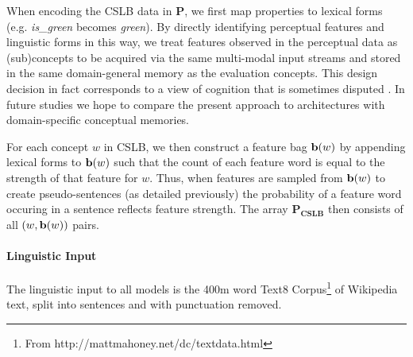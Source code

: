 When encoding the CSLB data in \(\mathbf{P}\), we first map properties to lexical forms (e.g. \emph{is\_green} becomes \emph{green}). By directly identifying perceptual features and linguistic forms in this way, we treat features observed in the perceptual data as (sub)concepts to be acquired via the same multi-modal input streams and stored in the same domain-general memory as the evaluation concepts. This design decision in fact corresponds to a view of cognition that is sometimes disputed \cite{fodor1983modularity}. In future studies we hope to compare the present approach to architectures with domain-specific conceptual memories. 

For each concept \(w\) in CSLB, we then construct a feature bag \({\bf b}(w)\) by appending lexical forms to \({\bf b}(w)\) such that the count of each feature word is equal to the strength of that feature for \(w\). Thus, when features are sampled from \({\bf b}(w)\) to create pseudo-sentences (as detailed previously) the probability of a feature word occuring in a sentence reflects feature strength. The array \(\mathbf{P_{CSLB}}\) then consists of all \( (w,  {\bf b}(w) ) \) pairs.

\paragraph{Linguistic Input} The linguistic input to all models is the 400m word Text8 Corpus\footnote{From http://mattmahoney.net/dc/textdata.html} of Wikipedia text, split into sentences and with punctuation removed. 



